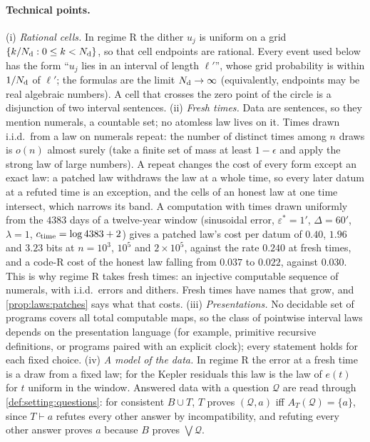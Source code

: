 \paragraph{Technical points.} (i) \emph{Rational cells.} In regime R the dither $u_j$ is uniform on a grid $\{k/N_{\rm d}:0\le k<N_{\rm d}\}$, so that cell endpoints are rational. Every event used below has the form ``$u_j$ lies in an interval of length $\ell'$'', whose grid probability is within $1/N_{\rm d}$ of $\ell'$; the formulas are the limit $N_{\rm d}\to\infty$ (equivalently, endpoints may be real algebraic numbers). A cell that crosses the zero point of the circle is a disjunction of two interval sentences. (ii) \emph{Fresh times.} Data are sentences, so they mention numerals, a countable set; no atomless law lives on it. Times drawn i.i.d.\ from a law on numerals repeat: the number of distinct times among $n$ draws is $o(n)$ almost surely (take a finite set of mass at least $1-\epsilon$ and apply the strong law of large numbers). A repeat changes the cost of every form except an exact law: a patched law withdraws the law at a whole time, so every later datum at a refuted time is an exception, and the cells of an honest law at one time intersect, which narrows its band. A computation with times drawn uniformly from the $4383$ days of a twelve-year window (sinusoidal error, $\varepsilon^*=1'$, $\Delta=60'$, $\lambda=1$, $c_{\rm time}=\log4383+2$) gives a patched law's cost per datum of $0.40$, $1.96$ and $3.23$ bits at $n=10^3$, $10^5$ and $2\times10^5$, against the rate $0.240$ at fresh times, and a code-R cost of the honest law falling from $0.037$ to $0.022$, against $0.030$. This is why regime R takes fresh times: an injective computable sequence of numerals, with i.i.d.\ errors and dithers. Fresh times have names that grow, and \cref{prop:laws:patches} says what that costs. (iii) \emph{Presentations.} No decidable set of programs covers all total computable maps, so the class of pointwise interval laws depends on the presentation language (for example, primitive recursive definitions, or programs paired with an explicit clock); every statement holds for each fixed choice. (iv) \emph{A model of the data.} In regime R the error at a fresh time is a draw from a fixed law; for the Kepler residuals this law is the law of $e(t)$ for $t$ uniform in the window. Answered data with a question $\mathcal Q$ are read through \cref{def:setting:questions}: for consistent $B\cup T$, $T$ proves $(\mathcal Q,a)$ iff $A_T(\mathcal Q)=\{a\}$, since $T\vdash a$ refutes every other answer by incompatibility, and refuting every other answer proves $a$ because $B$ proves $\bigvee\mathcal Q$.

